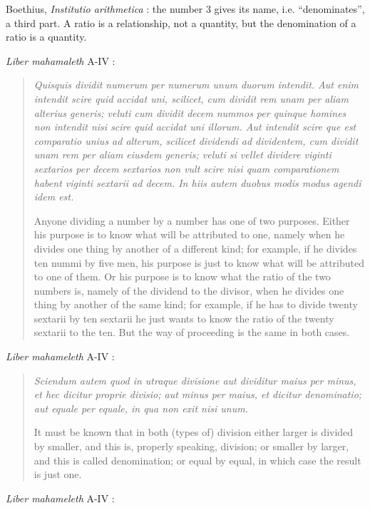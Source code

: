 \documentclass{article}
\begin{document}
Boethius, {\em Institutio arithmetica} \cite{friedlein}: the number 3 gives its name, i.e. ``denominates'', a third part.
A ratio is a relationship, not a quantity, but the denomination of a ratio is a quantity.

{\em Liber mahamaleth} A-IV \cite[pp.~66, 639]{mahameleth}:

\begin{quote}
{\em Quisquis dividit numerum per numerum unum duorum intendit. Aut enim intendit scire quid accidat uni, scilicet, cum dividit rem unam per aliam alterius generis; veluti cum dividit decem nummos per quinque homines non intendit nisi scire quid accidat uni illorum. Aut intendit scire que est comparatio unius ad alterum, scilicet dividendi ad dividentem, cum dividit unam rem per aliam eiusdem generis; veluti si vellet dividere viginti sextarios per decem sextarios non vult scire nisi quam comparationem habent viginti sextarii ad decem. In hiis autem duobus modis modus
agendi idem est.}

Anyone dividing a number by a number has one of two purposes. Either his purpose is to know what will be attributed to one, namely when he divides one thing by another of a different kind; for example, if he divides ten nummi by five men, his purpose is just to know what will be attributed to one of them. Or his purpose is to know what the ratio of the two numbers is, namely of the dividend to the divisor, when he divides one thing by another of the same kind; for example, if he has to divide twenty sextarii by ten sextarii he just wants to know the ratio of the twenty sextarii to the ten. But the way of proceeding is the same in both cases.
\end{quote}

{\em Liber mahameleth} A-IV \cite[pp.~66, 639]{mahameleth}:

\begin{quote}
{\em Sciendum autem quod in utraque divisione aut dividitur maius per minus, et hec dicitur proprie divisio; aut minus per maius, et dicitur denominatio; aut equale per equale, in qua non exit nisi unum.}

It must be known that in both (types of) division either larger is divided by smaller, and this is, properly speaking, division; or smaller by larger, and this is called denomination; or equal by equal, in which case the result is just one.
\end{quote}

{\em Liber mahameleth} A-IV \cite[pp.~66--67, 639--640]{mahameleth}:
\end{document}
